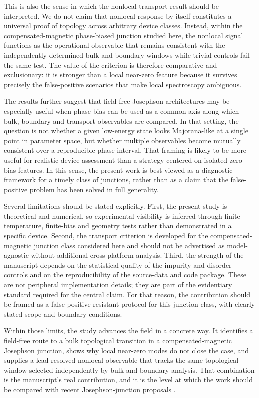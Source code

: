 \documentclass[11pt]{article}
\begin{document}
This is also the sense in which the nonlocal transport result should be interpreted. We do not claim that nonlocal response by itself constitutes a universal proof of topology across arbitrary device classes. Instead, within the compensated-magnetic phase-biased junction studied here, the nonlocal signal functions as the operational observable that remains consistent with the independently determined bulk and boundary windows while trivial controls fail the same test. The value of the criterion is therefore comparative and exclusionary: it is stronger than a local near-zero feature because it survives precisely the false-positive scenarios that make local spectroscopy ambiguous.

The results further suggest that field-free Josephson architectures may be especially useful when phase bias can be used as a common axis along which bulk, boundary and transport observables are compared. In that setting, the question is not whether a given low-energy state looks Majorana-like at a single point in parameter space, but whether multiple observables become mutually consistent over a reproducible phase interval. That framing is likely to be more useful for realistic device assessment than a strategy centered on isolated zero-bias features. In this sense, the present work is best viewed as a diagnostic framework for a timely class of junctions, rather than as a claim that the false-positive problem has been solved in full generality.

Several limitations should be stated explicitly. First, the present study is theoretical and numerical, so experimental visibility is inferred through finite-temperature, finite-bias and geometry tests rather than demonstrated in a specific device. Second, the transport criterion is developed for the compensated-magnetic junction class considered here and should not be advertised as model-agnostic without additional cross-platform analysis. Third, the strength of the manuscript depends on the statistical quality of the impurity and disorder controls and on the reproducibility of the source-data and code package. These are not peripheral implementation details; they are part of the evidentiary standard required for the central claim. For that reason, the contribution should be framed as a false-positive-resistant protocol for this junction class, with clearly stated scope and boundary conditions.

Within those limits, the study advances the field in a concrete way. It identifies a field-free route to a bulk topological transition in a compensated-magnetic Josephson junction, shows why local near-zero modes do not close the case, and supplies a lead-resolved nonlocal observable that tracks the same topological window selected independently by bulk and boundary analysis. That combination is the manuscript's real contribution, and it is the level at which the work should be compared with recent Josephson-junction proposals \cite{planar-jj-topological-sc,compensated-magnetic-jj-tajj-2026,nonlocal-majorana-diagnostic-theory}.
\end{document}
